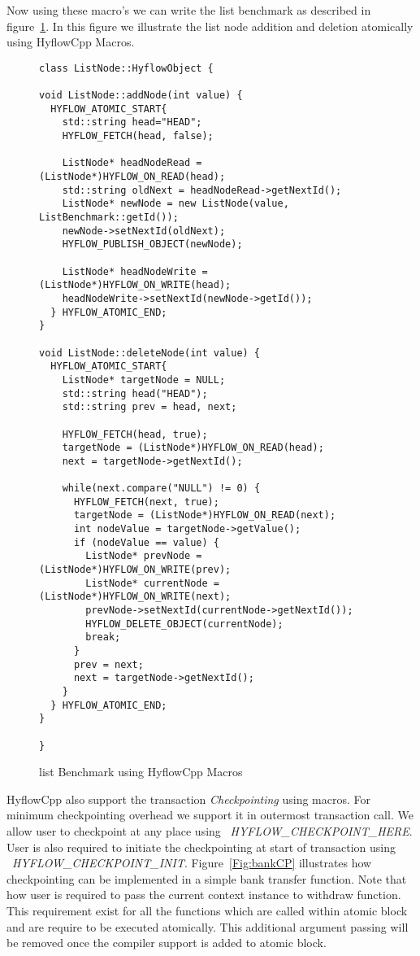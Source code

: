 \documentclass[12pt,english]{report}
\begin{document}
Now using these macro's we can write the list benchmark as described in figure~\ref{Fig:listMacro}. In this figure we illustrate the list node addition and deletion atomically using HyflowCpp Macros. 
\begin{figure}
\centering
\begin{lstlisting}
class ListNode::HyflowObject {

void ListNode::addNode(int value) {
  HYFLOW_ATOMIC_START{
	std::string head="HEAD";
	HYFLOW_FETCH(head, false);

	ListNode* headNodeRead =  (ListNode*)HYFLOW_ON_READ(head);
	std::string oldNext = headNodeRead->getNextId();
	ListNode* newNode = new ListNode(value, ListBenchmark::getId());
	newNode->setNextId(oldNext);
	HYFLOW_PUBLISH_OBJECT(newNode);

	ListNode* headNodeWrite = (ListNode*)HYFLOW_ON_WRITE(head);
	headNodeWrite->setNextId(newNode->getId());
  } HYFLOW_ATOMIC_END;
}

void ListNode::deleteNode(int value) {
  HYFLOW_ATOMIC_START{
	ListNode* targetNode = NULL;
	std::string head("HEAD");
	std::string prev = head, next;

	HYFLOW_FETCH(head, true);
	targetNode = (ListNode*)HYFLOW_ON_READ(head);
	next = targetNode->getNextId();

	while(next.compare("NULL") != 0) {
	  HYFLOW_FETCH(next, true);
	  targetNode = (ListNode*)HYFLOW_ON_READ(next);
	  int nodeValue = targetNode->getValue();
	  if (nodeValue == value) {
		ListNode* prevNode = (ListNode*)HYFLOW_ON_WRITE(prev);
		ListNode* currentNode = (ListNode*)HYFLOW_ON_WRITE(next);
		prevNode->setNextId(currentNode->getNextId());
		HYFLOW_DELETE_OBJECT(currentNode);
		break;
	  }
	  prev = next;
	  next = targetNode->getNextId();
	}
  } HYFLOW_ATOMIC_END;
}

}
\end{lstlisting}
\caption{list Benchmark using HyflowCpp Macros}
\label{Fig:listMacro}
\end{figure}

HyflowCpp also support the transaction \emph{Checkpointing} using macros. For minimum checkpointing overhead we support it in outermost transaction call. We allow user to checkpoint at any place using ~\emph{HYFLOW{\_}CHECKPOINT{\_}HERE}. User is also required to initiate the checkpointing at start of transaction using ~\emph{HYFLOW{\_}CHECKPOINT{\_}INIT}. Figure~\ref{Fig:bankCP} illustrates how checkpointing can be implemented in a simple bank transfer function. Note that how user is required to pass the current context instance to withdraw function. This requirement exist for all the functions which are called within atomic block and are require to be executed atomically. This additional argument passing will be removed once the compiler support is added to atomic block. 
\end{document}

